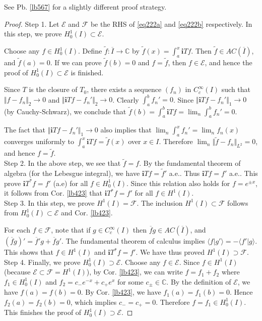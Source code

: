 \documentclass[12pt,b5paper,notitlepage]{article}
\theoremstyle{definition}
\theoremstyle{plain}
\newcommand{\mc}{\mathcal}
\newcommand{\wtd}{\widetilde}
\newcommand{\ovl}{\overline}
\newcommand{\bk}[1]{\langle {#1}\rangle}
\newcommand{\im}{\mathbf{i}}
\newcommand{\Cbb}{\mathbb C}
\newcommand{\ME}{\mathcal E}
\newcommand{\MF}{\mathcal F}
\numberwithin{equation}{section}
\begin{document}
See Pb. \ref{lb567} for a slightly different proof strategy.

\begin{proof}
Step 1. Let $\mc E$ and $\mc F$ be the RHS of \eqref{eq222a} and \eqref{eq222b} respectively. In this step, we prove $H^1_0(I)\subset\mc E$.

Choose any $f\in H_0^1(I)$. Define $\wtd f:\ovl I\rightarrow\Cbb$ by $\wtd f(x)=\int_a^x \im Tf$. Then $\wtd f\in AC(\ovl I)$, and $\wtd f(a)=0$. If we can prove $\wtd f(b)=0$ and $f=\wtd f$, then $f\in \ME$, and hence the proof of $H^1_0(I)\subset\mc E$ is finished.

Since $T$ is the closure of $T_0$,  there exists a sequence $(f_n)$ in $C_c^\infty(I)$ such that $\Vert f-f_n\Vert_2\rightarrow0$ and $\Vert \im Tf-f_n'\Vert_2\rightarrow0$. Clearly $\int_a^b f_n'=0$. Since $\Vert \im Tf-f_n'\Vert_1\rightarrow 0$ (by Cauchy-Schwarz), we conclude that $\wtd f(b)=\int_a^b\im Tf=\lim_n\int_a^b f_n'=0$.

The fact that $\Vert \im Tf-f_n'\Vert_1\rightarrow 0$ also implies that $\lim_n\int_a^x f_n'=\lim_nf_n(x)$ converges uniformly to $\int_a^x\im Tf=\wtd f(x)$ over $x\in I$. Therefore $\lim_n\Vert\wtd f-f_n\Vert_{L^2}=0$, and hence $f=\wtd f$.\\[-1ex]

Step 2. In the above step, we see that $\wtd f=f$. By the fundamental theorem of algebra (for the Lebesgue integral), we have $\im Tf=\wtd f'$ a.e.. Thus $\im Tf=f'$ a.e.. This prove $\im T^*f=f'$ (a.e) for all $f\in H^1_0(I)$. Since this relation also holds for $f=e^{\pm x}$, it follows from Cor. \ref{lb423} that $\im T^*f=f'$ for all $f\in H^1(I)$.\\[-1ex]

Step 3. In this step, we prove $H^1(I)=\MF$. The inclusion $H^1(I)\subset\MF$ follows from $H^1_0(I)\subset\ME$ and Cor. \ref{lb423}.

For each $f\in\mc F$, note that if $g\in C_c^\infty(I)$ then $\ovl fg\in AC(\ovl I)$, and $(\ovl fg)'=\ovl f'g+\ovl fg'$. The fundamental theorem of calculus implies $\bk{f|g'}=-\bk{f'|g}$. This shows that $f\in H^1(I)$ and $\im T^*f=f'$. We have thus proved $H^1(I)\supset \mc F$. \\[-1ex]

Step 4. Finally, we prove $H^1_0(I)\supset\mc E$. Choose any $f\in\mc E$. Since $f\in H^1(I)$ (because $\ME\subset\MF=H^1(I)$), by Cor. \ref{lb423}, we can write $f=f_1+f_2$ where $f_1\in H^1_0(I)$ and $f_2=c_-e^{-x}+c_+e^x$ for some $c_\pm\in\Cbb$. By the definition of $\mc E$, we have $f(a)=f(b)=0$. By Cor. \ref{lb423}, we have $f_1(a)=f_1(b)=0$. Hence $f_2(a)=f_2(b)=0$, which implies $c_-=c_+=0$. Therefore $f=f_1\in H^1_0(I)$. This finishes the proof of $H^1_0(I)\supset\mc E$.
\end{proof}
\end{document}
